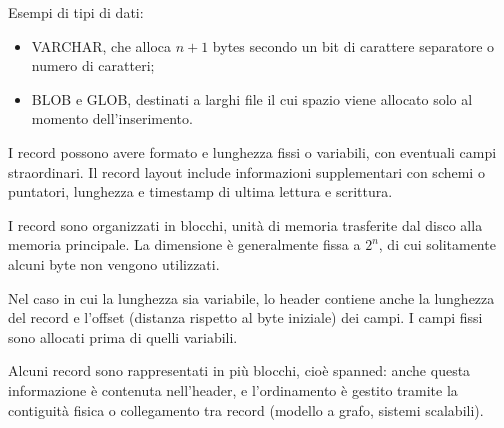 Esempi di tipi di dati:
\begin{itemize}
	\item VARCHAR, che alloca $n + 1$ bytes secondo un bit di carattere separatore o numero di caratteri;
	\item BLOB e GLOB, destinati a larghi file il cui spazio viene allocato solo al momento dell'inserimento.
\end{itemize}

I record possono avere formato e lunghezza fissi o variabili, con eventuali campi straordinari. Il record layout include informazioni supplementari con schemi o puntatori, lunghezza e timestamp di ultima lettura e scrittura. 

I record sono organizzati in blocchi, unità di memoria trasferite dal disco alla memoria principale. La dimensione è generalmente fissa a $2^n$, di cui solitamente alcuni byte non vengono utilizzati. 

Nel caso in cui la lunghezza sia variabile, lo header contiene anche la lunghezza del record e l'offset (distanza rispetto al byte iniziale) dei campi. I campi fissi sono allocati prima di quelli variabili. 

Alcuni record sono rappresentati in più blocchi, cioè spanned: anche questa informazione è contenuta nell'header, e l'ordinamento è gestito tramite la contiguità fisica o collegamento tra record (modello a grafo, sistemi scalabili). 

